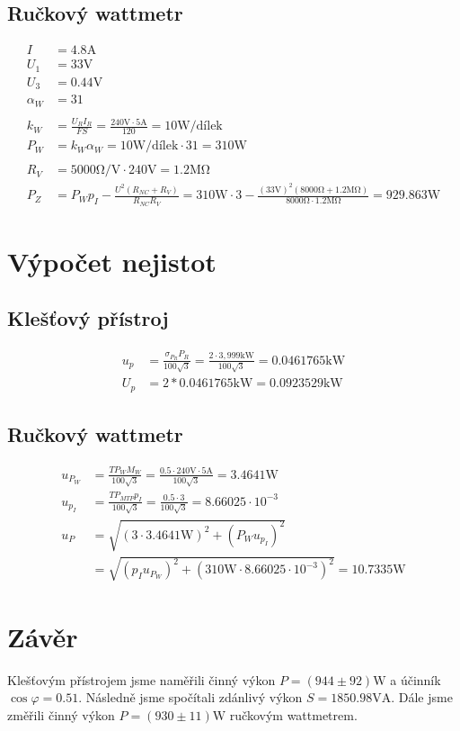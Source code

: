 \documentclass{article}
\begin{document}
\subsection{Ručkový wattmetr}
$$
\begin{aligned}
	I &= 4.8 \si{\ampere}\\
	U_1 &= 33 \si{\volt}\\
	U_3 &= 0.44 \si{\volt}\\
	\alpha_W &= 31\\
	\\
	k_W &= \frac{U_RI_R}{FS} = \frac{240\si{\volt}\cdot5\si{\ampere}}{120} = 10 \si{\watt\per\text{dílek}}\\
	P_W &= k_W\alpha_W = 10 \si{\watt\per\text{dílek}} \cdot 31 = 310 \si{\watt}\\
	\\
	R_V &= 5000\si{\ohm\per\volt}\cdot240\si{\volt}=1.2\si{\mega\ohm}\\
	P_Z &= P_Wp_I-\frac{U^2(R_{NC}+R_V)}{R_{NC}R_V} = 310 \si{\watt}\cdot3-\frac{(33 \si{\volt})^2(8000\si{\ohm}+1.2\si{\mega\ohm})}{8000\si{\ohm} \cdot 1.2\si{\mega\ohm}} = 929.863 \si{\watt}
\end{aligned}
$$
\section{Výpočet nejistot}
\subsection{Klešťový přístroj}
$$
\begin{aligned}
	u_p &= \frac{\sigma_{P_R} P_R}{100\sqrt{3}} = \frac{2 \cdot 3,999 \si{\kilo\watt}}{100\sqrt{3}} = 0.0461765 \si{\kilo\watt}\\
	U_p&=2*0.0461765 \si{\kilo\watt} = 0.0923529 \si{\kilo\watt}
\end{aligned}
$$
\subsection{Ručkový wattmetr}
$$
\begin{aligned}
	u_{P_W} &= \frac{{TP}_WM_W}{100\sqrt{3}} = \frac{0.5\cdot240\si{\volt}\cdot5\si{\ampere}}{100\sqrt{3}} = 3.4641 \si{\watt}\\
	u_{p_I} &= \frac{{TP}_{MTP}p_I}{100\sqrt{3}} = \frac{0.5 \cdot 3}{100\sqrt{3}} = 8.66025\cdot10^{-3}\\
	u_P&=\sqrt{(3 \cdot 3.4641 \si{\watt})^2+(P_Wu_{p_I})^2}\\ &= \sqrt{(p_Iu_{P_W})^2+(310 \si{\watt} \cdot 8.66025\cdot10^{-3})^2} = 10.7335\si{\watt}
\end{aligned}
$$
\section{Závěr}
Klešťovým přístrojem jsme naměřili činný výkon $P = (944 \pm 92)\si{\watt}$ a účinník $\cos{\varphi}=0.51$. Následně jsme spočítali zdánlivý výkon $S = 1850.98\si{\volt\ampere}$. Dále jsme změřili činný výkon $P = (930 \pm 11)\si{\watt}$ ručkovým wattmetrem.
\end{document}
